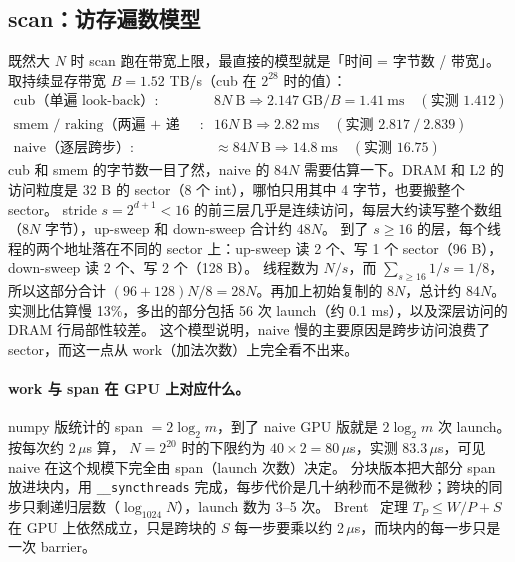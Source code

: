 \documentclass[11pt,a4paper]{ctexart}
\begin{document}
\subsection{scan：访存遍数模型}
既然大 $N$ 时 scan 跑在带宽上限，最直接的模型就是「时间 = 字节数 / 带宽」。取持续显存带宽 $B=1.52$ TB/s（cub 在 $2^{28}$ 时的值）：
\begin{align*}
\text{cub（单遍 look-back）}: &\ 8N\ \text{B} \Rightarrow 2.147\ \text{GB}/B = 1.41\ \text{ms}\quad(\text{实测 }1.412)\\
\text{smem / raking（两遍 + 递归）}: &\ 16N\ \text{B} \Rightarrow 2.82\ \text{ms}\quad(\text{实测 }2.817\ /\ 2.839)\\
\text{naive（逐层跨步）}: &\ \approx 84N\ \text{B} \Rightarrow 14.8\ \text{ms}\quad(\text{实测 }16.75)
\end{align*}
cub 和 smem 的字节数一目了然，naive 的 $84N$ 需要估算一下。DRAM 和 L2 的访问粒度是 32 B 的 sector（8 个 int），哪怕只用其中 4 字节，也要搬整个 sector。
stride $s=2^{d+1}<16$ 的前三层几乎是连续访问，每层大约读写整个数组（$8N$ 字节），up-sweep 和 down-sweep 合计约 $48N$。
到了 $s\ge16$ 的层，每个线程的两个地址落在不同的 sector 上：up-sweep 读 2 个、写 1 个 sector（96 B），down-sweep 读 2 个、写 2 个（128 B）。
线程数为 $N/s$，而 $\sum_{s\ge16}1/s=1/8$，所以这部分合计 $(96+128)N/8=28N$。再加上初始复制的 $8N$，总计约 $84N$。
实测比估算慢 13\%，多出的部分包括 56 次 launch（约 0.1 ms），以及深层访问的 DRAM 行局部性较差。
这个模型说明，naive 慢的主要原因是跨步访问浪费了 sector，而这一点从 work（加法次数）上完全看不出来。

\paragraph{work 与 span 在 GPU 上对应什么。} numpy 版统计的 span $=2\log_2 m$，到了 naive GPU 版就是 $2\log_2 m$ 次 launch。按每次约 2\,$\mu$s 算，
$N=2^{20}$ 时的下限约为 $40\times2=80\,\mu$s，实测 83.3\,$\mu$s，可见 naive 在这个规模下完全由 span（launch 次数）决定。
分块版本把大部分 span 放进块内，用 \texttt{\_\_syncthreads} 完成，每步代价是几十纳秒而不是微秒；跨块的同步只剩递归层数（$\log_{1024}N$），launch 数为 3--5 次。
Brent~\cite{brent1974} 定理 $T_P\le W/P+S$ 在 GPU 上依然成立，只是跨块的 $S$ 每一步要乘以约 2\,$\mu$s，而块内的每一步只是一次 barrier。
\end{document}
